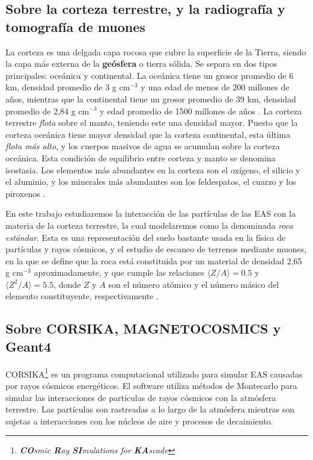 \documentclass[12pt]{report}
\begin{document}


\subsection*{Sobre la corteza terrestre, y la radiografía y tomografía de muones}

La corteza es una delgada capa rocosa que cubre la superficie de la Tierra, siendo la capa más externa de la \textbf{geósfera} o tierra sólida. Se separa en dos tipos principales: oceánica y continental. La oceánica tiene un grosor promedio de 6 km, densidad promedio de 3 g cm$^{-3}$ y una edad de menos de 200 millones de años, mientras que la continental tiene un grosor promedio de 39 km, densidad promedio de 2,84 g cm$^{-3}$ y edad promedio de 1500 millones de años \cite{mooney20101}. La corteza terrestre \textit{flota} sobre el manto, teniendo este una densidad mayor. Puesto que la corteza oceánica tiene mayor densidad que la corteza continental, esta última \textit{flota más alto}, y los cuerpos masivos de agua se acumulan sobre la corteza oceánica. Esta condición de equilibrio entre corteza y manto se denomina isostasia. Los elementos más abundantes en la corteza son el oxígeno, el silicio y el aluminio, y los minerales más abundantes son los feldespatos, el cuarzo y los piroxenos \cite{anderson2010geomorphology}.

En este trabajo estudiaremos la interacción de las partículas de las EAS con la materia de la corteza terrestre, la cual modelaremos como la denominada \textit{roca estándar}. Esta es una representación del suelo bastante usada en la física de partículas y rayos cósmicos, y el estudio de escaneo de terrenos mediante muones, en la que se define que la roca está constituida por un material de densidad 2,65 g cm$^{-3}$ aproximadamente, y que cumple las relaciones $\langle Z/A \rangle=0.5$ y $\langle Z^2/A \rangle=5.5$, donde $Z$ y $A$ son el número atómico y el número másico del elemento constituyente, respectivamente \cite{groom2001muon}.



\subsection*{Sobre CORSIKA, MAGNETOCOSMICS y Geant4}

CORSIKA\footnote{\textit{\textbf{CO}smic \textbf{R}ay \textbf{SI}mulations for \textbf{KA}scade}} es un programa computacional utilizado para simular EAS causadas por rayos cósmicos energéticos. El software utiliza métodos de Montecarlo para simular las interacciones de partículas de rayos cósmicos con la atmósfera terrestre. Las partículas son rastreadas a lo largo de la atmósfera mientras son sujetas a interacciones con los núcleos de aire y procesos de decaimiento.
\end{document}
